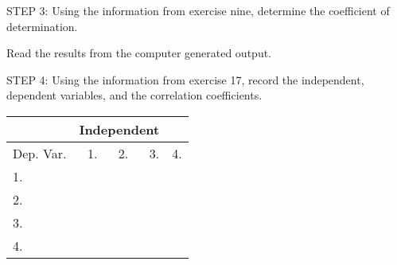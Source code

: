\documentclass[11pt]{book}\usepackage[]{graphicx}\usepackage[]{color}
\begin{document}
\begin{exercises}
\begin{solution}
    \end{solution}

  \begin{exercise} %

    STEP 3: Using the information from exercise nine, determine the coefficient of determination.

    \vspace{5mm}

    \end{exercise}
    \begin{solution}    %

       Read the results from the computer generated output.

    \end{solution}

  \begin{exercise} %


    STEP 4: Using the information from exercise 17, record the independent, dependent variables, and the correlation coefficients.

     \begin{table}[ht]
     \centering
     {\tiny{
     \begin{tabular}{lrrrr} \hline
         &  \multicolumn{3}{c}{Independent} \\ \hline

     Dep. Var. & 1. \underline{\phantom{xxxx}} &
                 2. \underline{\phantom{xxxx}} &
                 3. \underline{\phantom{xxxx}} &
                 4. \underline{\phantom{xxxx}} \\ \hline
     1. \underline{\phantom{xxxx}}  &
     \underline{\phantom{xxxx}}  \\ \hline
     2. \underline{\phantom{xxxx}}  &
     \underline{\phantom{xxxx}} &
     \underline{\phantom{xxxx}}  \\ \hline
     3. \underline{\phantom{xxxx}}  &
     \underline{\phantom{xxxx}} &
     \underline{\phantom{xxxx}} &
     \underline{\phantom{xxxx}}  \\ \hline
     4. \underline{\phantom{xxxx}}  &
     \underline{\phantom{xxxx}} &
     \underline{\phantom{xxxx}} &
     \underline{\phantom{xxxx}} &
     \underline{\phantom{xxxx}}  \\ \hline
     \end{tabular}
     }}
     \end{table}



\end{exercise}
\end{exercises}
\end{document}
